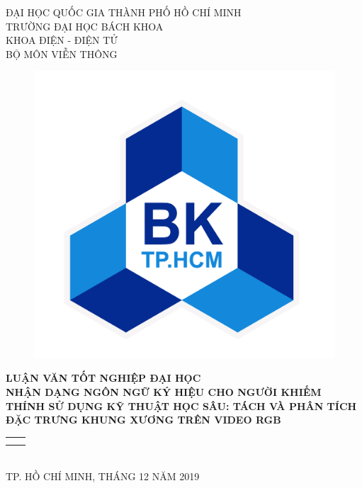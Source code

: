 \begin{titlepage}

\newcommand{\HRule}{\rule{\linewidth}{0.5mm}}
\centering
\begin{center}
\large ĐẠI HỌC QUỐC GIA THÀNH PHỐ HỒ CHÍ MINH \\
TRƯỜNG ĐẠI HỌC BÁCH KHOA \\
KHOA ĐIỆN - ĐIỆN TỬ  \\
BỘ MÔN VIỄN THÔNG  \\ [0.2cm]
\end{center}

\begin{figure}[!ht]
    \centering
    \includegraphics[scale=0.3]{front_pages/Logo_BK.png}
    \label{fig:logo}
\end{figure}

\bfseries
\Large{LUẬN VĂN TỐT NGHIỆP ĐẠI HỌC} \\[1.3cm]


\LARGE{NHẬN DẠNG NGÔN NGỮ KÝ HIỆU CHO  NGƯỜI KHIẾM THÍNH SỬ DỤNG KỸ THUẬT HỌC SÂU: TÁCH VÀ PHÂN TÍCH ĐẶC TRƯNG KHUNG XƯƠNG TRÊN VIDEO RGB} \\ [2.1cm]

\normalfont
\normalsize

\centering
\begin{tabular}{r l}
    \fontsize{14pt}{0pt}{\selectfont{GVHD:}} & \fontsize{14pt}{0pt}{\selectfont{PGS.TS HÀ HOÀNG KHA}} \\
    \fontsize{14pt}{0pt}{\selectfont{SVTH:}} & \fontsize{14pt}{0pt}{\selectfont{NGUYỄN THÀNH ĐẠT - 1510698}}  					
                        
\end{tabular} 
\\ [2.1cm]

\centering
TP. HỒ CHÍ MINH, THÁNG 12 NĂM 2019
\end{titlepage}


